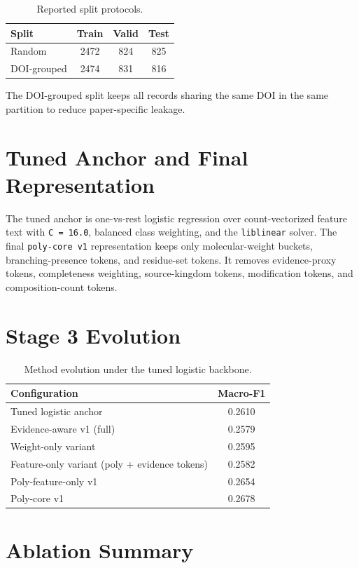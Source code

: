 \documentclass{article}
\begin{document}
\begin{table}[h]
\centering
\caption{Reported split protocols.}
\begin{tabular}{lccc}
\toprule
Split & Train & Valid & Test \\
\midrule
Random & 2472 & 824 & 825 \\
DOI-grouped & 2474 & 831 & 816 \\
\bottomrule
\end{tabular}
\end{table}

The DOI-grouped split keeps all records sharing the same DOI in the same partition to reduce paper-specific leakage.

\section{Tuned Anchor and Final Representation}

The tuned anchor is one-vs-rest logistic regression over count-vectorized feature text with \texttt{C = 16.0}, balanced class weighting, and the \texttt{liblinear} solver. The final \texttt{poly-core v1} representation keeps only molecular-weight buckets, branching-presence tokens, and residue-set tokens. It removes evidence-proxy tokens, completeness weighting, source-kingdom tokens, modification tokens, and composition-count tokens.

\section{Stage 3 Evolution}

\begin{table}[h]
\centering
\caption{Method evolution under the tuned logistic backbone.}
\begin{tabular}{lc}
\toprule
Configuration & Macro-F1 \\
\midrule
Tuned logistic anchor & 0.2610 \\
Evidence-aware v1 (full) & 0.2579 \\
Weight-only variant & 0.2595 \\
Feature-only variant (poly + evidence tokens) & 0.2582 \\
Poly-feature-only v1 & 0.2654 \\
Poly-core v1 & 0.2678 \\
\bottomrule
\end{tabular}
\end{table}

\section{Ablation Summary}
\end{document}
